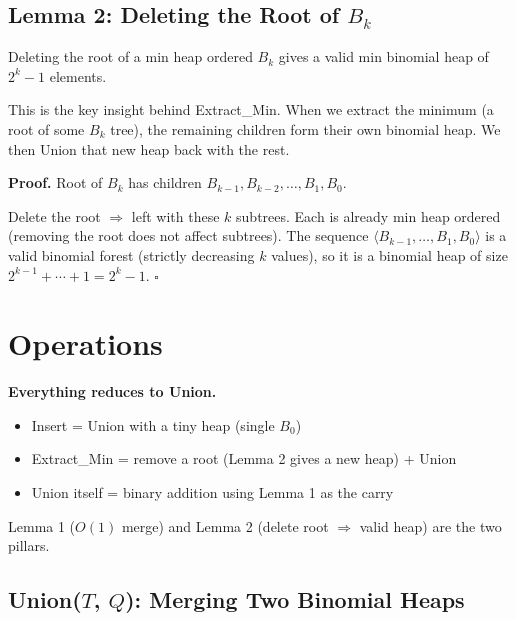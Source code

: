 \documentclass[11pt]{article}
\begin{document}
\subsection{Lemma 2: Deleting the Root of $B_k$}

\begin{keybox}[Lemma 2]
Deleting \textcolor{rustW}{the root} of a min heap ordered $B_k$ gives a valid \textcolor{greenO}{min binomial heap} of $2^k - 1$ elements.
\end{keybox}

\begin{keybox}
This is the key insight behind Extract\_Min. When we extract the minimum (a root of some $B_k$ tree), the remaining children form their own binomial heap. We then Union that new heap back with the rest.
\end{keybox}

\textbf{Proof.} Root of $B_k$ has children $B_{k-1}, B_{k-2}, \ldots, B_1, B_0$.

Delete the root $\Rightarrow$ left with these $k$ subtrees. Each is already min heap ordered (removing the root does not affect subtrees). The sequence $\langle B_{k-1}, \ldots, B_1, B_0 \rangle$ is a valid binomial forest (strictly decreasing $k$ values), so it is a binomial heap of size $2^{k-1} + \cdots + 1 = 2^k - 1$. \hfill $\square$

\section{Operations}

\begin{keybox}
\textbf{Everything reduces to Union.}
\begin{itemize}[leftmargin=1.4em,itemsep=2pt]
  \item Insert = Union with a tiny heap (single $B_0$)
  \item Extract\_Min = remove a root (Lemma 2 gives a new heap) + Union
  \item Union itself = binary addition using Lemma 1 as the carry
\end{itemize}
Lemma 1 ($O(1)$ merge) and Lemma 2 (delete root $\Rightarrow$ valid heap) are the two pillars.
\end{keybox}

\subsection{Union($T$, $Q$): Merging Two Binomial Heaps}
\end{document}
